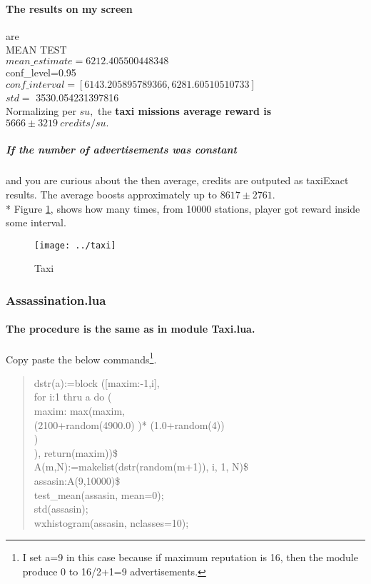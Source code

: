 \documentclass[]{article}
\begin{document}
\paragraph*{The results on my screen} are\\
MEAN TEST\\
$mean\_estimate=6212.405500448348$\\
conf\_level=0.95\\
$conf\_interval=[6143.205895789366,6281.60510510733]$\\
$std=$ 3530.054231397816\\
Normalizing per $su,$ the \textbf{taxi missions average reward is $5666\pm3219\ credits/su.$}
\subparagraph*{If the number of advertisements was constant} and you are curious about the then average, credits are outputed as taxiExact results. 
The average boosts approximately up to $8617\pm2761.$  \\*
Figure \ref{fig:taxi}, shows how many times, from 10000 stations, player got reward inside some interval.\\ 
\begin{figure}[h]
	\centering
	\texttt{[image: ../taxi]}
	\caption{Taxi}
	\label{fig:taxi}
\end{figure}


\subsubsection{Assassination.lua}
\paragraph*{The procedure is the same as in module Taxi.lua.} Copy paste the below  commands\footnote{I set a=9 in this case because if maximum reputation is 16, then the module produce 0 to 16/2+1=9 advertisements.}.

\begin{quote}
	dstr(a):=block ([maxim:-1,i],\\
\hspace*{10mm}	for i:1 thru a do (\\
\hspace*{20mm}	maxim: max(maxim,\\
\hspace*{20mm}	(2100+random(4900.0) )* (1.0+random(4))\\
\hspace*{20mm}	)\\
	), return(maxim))\$\\
	
	A(m,N):=makelist(dstr(random(m+1)), i, 1, N)\$\\	
	assasin:A(9,10000)\$\\	
	test\_mean(assasin, mean=0);\\	
	std(assasin);\\
	wxhistogram(assasin, nclasses=10);
\end{quote}
\end{document}
